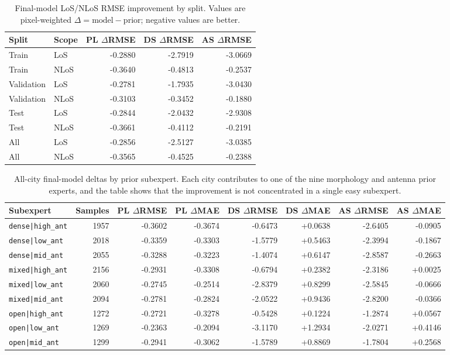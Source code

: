 \begin{table}[H]
\centering
\caption[Final-model LoS/NLoS improvement by split.]%
{Final-model LoS/NLoS RMSE improvement by split. Values are
pixel-weighted \(\Delta=\mathrm{model}-\mathrm{prior}\); negative values are
better.}
\label{tab:try80_los_nlos_split_delta}
\scriptsize
\begin{tabular}{llrrr}
\toprule
Split & Scope & PL \(\Delta\)RMSE & DS \(\Delta\)RMSE & AS \(\Delta\)RMSE \\
\midrule
Train & LoS & -0.2880 & -2.7919 & -3.0669 \\
Train & NLoS & -0.3640 & -0.4813 & -0.2537 \\
Validation & LoS & -0.2781 & -1.7935 & -3.0430 \\
Validation & NLoS & -0.3103 & -0.3452 & -0.1880 \\
Test & LoS & -0.2844 & -2.0432 & -2.9308 \\
Test & NLoS & -0.3661 & -0.4112 & -0.2191 \\
All & LoS & -0.2856 & -2.5127 & -3.0385 \\
All & NLoS & -0.3565 & -0.4525 & -0.2388 \\
\bottomrule
\end{tabular}
\end{table}

\begin{table}[H]
\centering
\caption[All-city final-model deltas by prior subexpert.]%
{All-city final-model deltas by prior subexpert. Each city contributes to
one of the nine morphology and antenna prior experts, and the table shows that
the improvement is not concentrated in a single easy subexpert.}
\label{tab:try80_subexpert_delta}
\scriptsize
\begin{tabular}{lrrrrrrr}
\toprule
Subexpert & Samples & PL \(\Delta\)RMSE & PL \(\Delta\)MAE & DS \(\Delta\)RMSE & DS \(\Delta\)MAE & AS \(\Delta\)RMSE & AS \(\Delta\)MAE \\
\midrule
\texttt{dense|high\_ant} & 1957 & -0.3602 & -0.3674 & -0.6473 & +0.0638 & -2.6405 & -0.0905 \\
\texttt{dense|low\_ant} & 2018 & -0.3359 & -0.3303 & -1.5779 & +0.5463 & -2.3994 & -0.1867 \\
\texttt{dense|mid\_ant} & 2055 & -0.3288 & -0.3223 & -1.4074 & +0.6147 & -2.8587 & -0.2663 \\
\texttt{mixed|high\_ant} & 2156 & -0.2931 & -0.3308 & -0.6794 & +0.2382 & -2.3186 & +0.0025 \\
\texttt{mixed|low\_ant} & 2060 & -0.2745 & -0.2514 & -2.8379 & +0.8299 & -2.5845 & -0.0666 \\
\texttt{mixed|mid\_ant} & 2094 & -0.2781 & -0.2824 & -2.0522 & +0.9436 & -2.8200 & -0.0366 \\
\texttt{open|high\_ant} & 1272 & -0.2721 & -0.3278 & -0.5428 & +0.1224 & -1.2874 & +0.0567 \\
\texttt{open|low\_ant} & 1269 & -0.2363 & -0.2094 & -3.1170 & +1.2934 & -2.0271 & +0.4146 \\
\texttt{open|mid\_ant} & 1299 & -0.2941 & -0.3062 & -1.5789 & +0.8869 & -1.7804 & +0.2568 \\
\bottomrule
\end{tabular}
\end{table}

